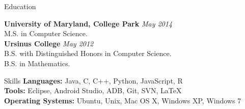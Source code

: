 \documentclass{resume} %
\begin{document}

\begin{rSection}{Education}

{\bf University of Maryland, College Park} \hfill {\em May 2014} \\ 
M.S. in Computer Science.\\

{\bf Ursinus College} \hfill {\em May 2012} \\ 
B.S. with Distinguished Honors in Computer Science.\\
B.S. in Mathematics.
\end{rSection}

\begin{rSection}{Skills}
\textbf{Languages:} Java, C, C++, Python, JavaScript, R\\
\textbf{Tools:} Eclipse, Android Studio, ADB, Git, SVN, LaTeX\\
\textbf{Operating Systems:} Ubuntu, Unix, Mac OS X, Windows XP, Windows 7
\end{rSection}
\end{document}
